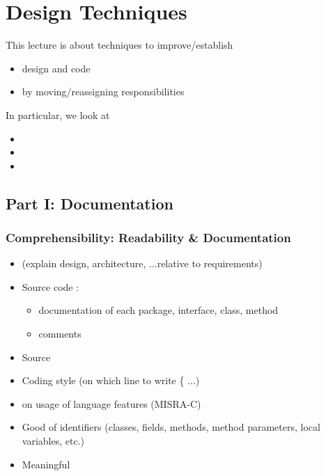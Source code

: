 \section{Design Techniques}
 
This lecture is about techniques to improve/establish
\begin{itemize}
    \item design and code 
    \item {} by moving/reassigning responsibilities
\end{itemize}
In particular, we look at 
\begin{itemize}
    \item {}
    \item {}
    \item {} 
\end{itemize}
\subsection{Part I: Documentation}
\subsubsection{Comprehensibility: Readability \& Documentation}
\begin{defBox}[title=Readability requires: ...]
    \begin{itemize}
        \item {} (explain design, architecture, ...relative to requirements)
        \item Source code :
        \begin{itemize}
            \item {} documentation of each package, interface, class, method
            \item {} comments
        \end{itemize}
        \item Source 
    \end{itemize}
\end{defBox}
\begin{defBox}[title=Code Specific Aspects]
    \begin{itemize}
        \item Coding style  (on which line to write \{ ...)
        \item {} on usage of language features (MISRA-C)
        \item Good  of identifiers (classes, fields, methods, method parameters, local variables, etc.)
        \item Meaningful 
    \end{itemize}
\end{defBox}
